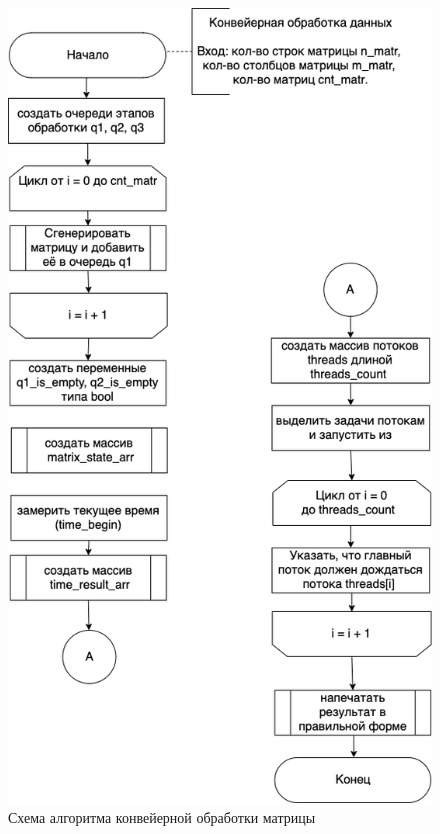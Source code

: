 \clearpage

\begin{figure}[h]
	\centering
	\includegraphics[scale=0.6]{img/parallel_processing.png}
	\caption{Схема алгоритма конвейерной обработки матрицы}
	\label{fig:parallel_processing}
\end{figure}

\clearpage

